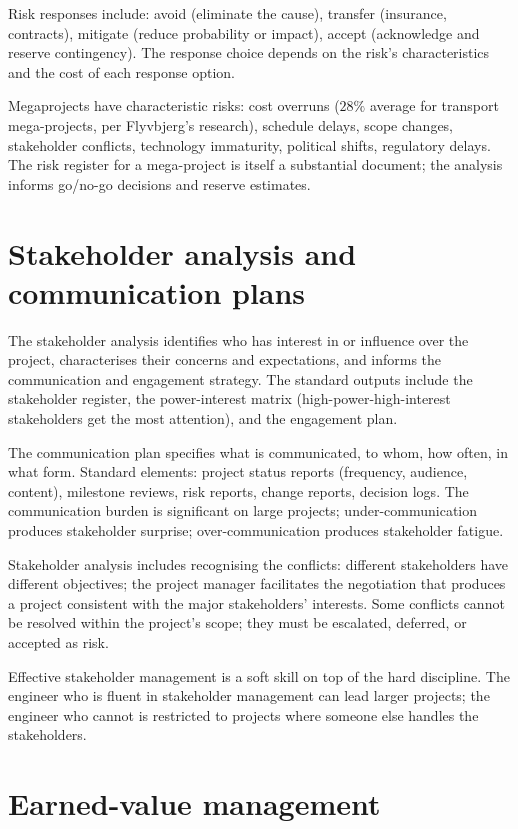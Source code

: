 Risk responses include: avoid (eliminate the cause), transfer (insurance, contracts), mitigate (reduce probability or impact), accept (acknowledge and reserve contingency). The response choice depends on the risk's characteristics and the cost of each response option.

Megaprojects have characteristic risks: cost overruns ($28\%$ average for transport mega-projects, per Flyvbjerg's research), schedule delays, scope changes, stakeholder conflicts, technology immaturity, political shifts, regulatory delays. The risk register for a mega-project is itself a substantial document; the analysis informs go/no-go decisions and reserve estimates.

\section{Stakeholder analysis and communication plans}

The stakeholder analysis identifies who has interest in or influence over the project, characterises their concerns and expectations, and informs the communication and engagement strategy. The standard outputs include the stakeholder register, the power-interest matrix (high-power-high-interest stakeholders get the most attention), and the engagement plan.

The communication plan specifies what is communicated, to whom, how often, in what form. Standard elements: project status reports (frequency, audience, content), milestone reviews, risk reports, change reports, decision logs. The communication burden is significant on large projects; under-communication produces stakeholder surprise; over-communication produces stakeholder fatigue.

Stakeholder analysis includes recognising the conflicts: different stakeholders have different objectives; the project manager facilitates the negotiation that produces a project consistent with the major stakeholders' interests. Some conflicts cannot be resolved within the project's scope; they must be escalated, deferred, or accepted as risk.

Effective stakeholder management is a soft skill on top of the hard discipline. The engineer who is fluent in stakeholder management can lead larger projects; the engineer who cannot is restricted to projects where someone else handles the stakeholders.

\section{Earned-value management}

